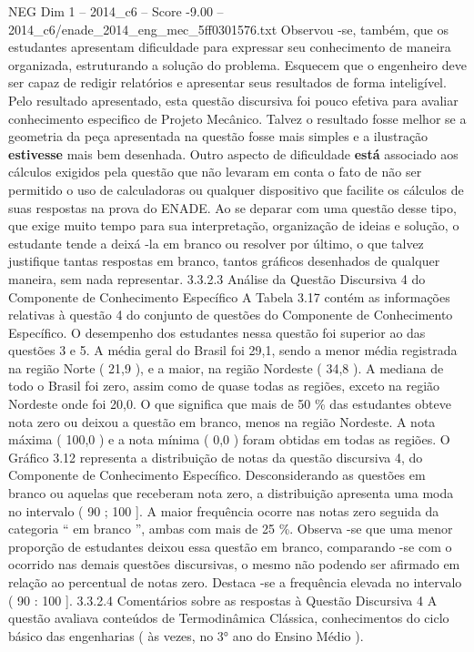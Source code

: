 \begin{textsample}{NEG Dim 1 – 2014\_c6 – Score -9.00 – 2014\_c6/enade\_2014\_eng\_mec\_5ff0301576.txt}
Observou -se, também, que os estudantes apresentam dificuldade para expressar seu conhecimento de maneira organizada, estruturando a solução do problema.
Esquecem que o engenheiro deve ser capaz de redigir relatórios e apresentar seus resultados de forma inteligível.
Pelo resultado apresentado, esta questão discursiva foi pouco efetiva para avaliar conhecimento especifico de Projeto Mecânico.
Talvez o resultado fosse melhor se a geometria da peça apresentada na questão fosse mais simples e a ilustração \textbf{estivesse} mais bem desenhada.
Outro aspecto de dificuldade \textbf{está} associado aos cálculos exigidos pela questão que não levaram em conta o fato de não ser permitido o uso de calculadoras ou qualquer dispositivo que facilite os cálculos de suas respostas na prova do ENADE.
Ao se deparar com uma questão desse tipo, que exige muito tempo para sua interpretação, organização de ideias e solução, o estudante tende a deixá -la em branco ou resolver por último, o que talvez justifique tantas respostas em branco, tantos gráficos desenhados de qualquer maneira, sem nada representar. 3.3.2.3 Análise da Questão Discursiva 4 do Componente de Conhecimento Específico A Tabela 3.17 contém as informações relativas à questão 4 do conjunto de questões do Componente de Conhecimento Específico.
O desempenho dos estudantes nessa questão foi superior ao das questões 3 e 5.
A média geral do Brasil foi 29,1, sendo a menor média registrada na região Norte ( 21,9 ), e a maior, na região Nordeste ( 34,8 ).
A mediana de todo o Brasil foi zero, assim como de quase todas as regiões, exceto na região Nordeste onde foi 20,0.
O que significa que mais de 50 \% das estudantes obteve nota zero ou deixou a questão em branco, menos na região Nordeste.
A nota máxima ( 100,0 ) e a nota mínima ( 0,0 ) foram obtidas em todas as regiões.
O Gráfico 3.12 representa a distribuição de notas da questão discursiva 4, do Componente de Conhecimento Específico.
Desconsiderando as questões em branco ou aquelas que receberam nota zero, a distribuição apresenta uma moda no intervalo ( 90 ; 100 ].
A maior frequência ocorre nas notas zero seguida da categoria “ em branco ”, ambas com mais de 25 \%.
Observa -se que uma menor proporção de estudantes deixou essa questão em branco, comparando -se com o ocorrido nas demais questões discursivas, o mesmo não podendo ser afirmado em relação ao percentual de notas zero.
Destaca -se a frequência elevada no intervalo ( 90 : 100 ]. 3.3.2.4 Comentários sobre as respostas à Questão Discursiva 4 A questão avaliava conteúdos de Termodinâmica Clássica, conhecimentos do ciclo básico das engenharias ( às vezes, no 3{\EmojiFont °} ano do Ensino Médio ).

\end{textsample}

